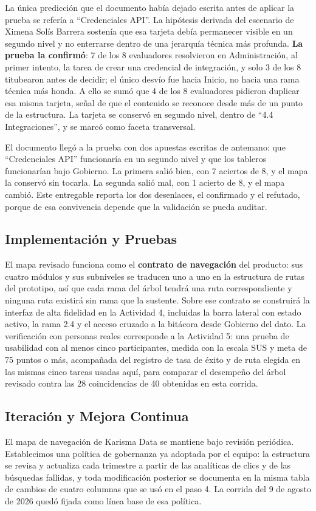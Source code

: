La única predicción que el documento había dejado escrita antes de aplicar la prueba se refería a ``Credenciales API''. La hipótesis derivada del escenario de Ximena Solís Barrera sostenía que esa tarjeta debía permanecer visible en un segundo nivel y no enterrarse dentro de una jerarquía técnica más profunda. \textbf{La prueba la confirmó}: 7 de los 8 evaluadores resolvieron en Administración, al primer intento, la tarea de crear una credencial de integración, y solo 3 de los 8 titubearon antes de decidir; el único desvío fue hacia Inicio, no hacia una rama técnica más honda. A ello se sumó que 4 de los 8 evaluadores pidieron duplicar esa misma tarjeta, señal de que el contenido se reconoce desde más de un punto de la estructura. La tarjeta se conservó en segundo nivel, dentro de ``4.4 Integraciones'', y se marcó como faceta transversal.

\begin{uxnota}
El documento llegó a la prueba con dos apuestas escritas de antemano: que ``Credenciales API'' funcionaría en un segundo nivel y que los tableros funcionarían bajo Gobierno. La primera salió bien, con 7 aciertos de 8, y el mapa la conservó sin tocarla. La segunda salió mal, con 1 acierto de 8, y el mapa cambió. Este entregable reporta los dos desenlaces, el confirmado y el refutado, porque de esa convivencia depende que la validación se pueda auditar.
\end{uxnota}

\subsection{Implementación y Pruebas}
El mapa revisado funciona como el \textbf{contrato de navegación} del producto: sus cuatro módulos y sus subniveles se traducen uno a uno en la estructura de rutas del prototipo, así que cada rama del árbol tendrá una ruta correspondiente y ninguna ruta existirá sin rama que la sustente. Sobre ese contrato se construirá la interfaz de alta fidelidad en la Actividad 4, incluidas la barra lateral con estado activo, la rama 2.4 y el acceso cruzado a la bitácora desde Gobierno del dato. La verificación con personas reales corresponde a la Actividad 5: una prueba de usabilidad con al menos cinco participantes, medida con la escala SUS y meta de 75 puntos o más, acompañada del registro de tasa de éxito y de ruta elegida en las mismas cinco tareas usadas aquí, para comparar el desempeño del árbol revisado contra las 28 coincidencias de 40 obtenidas en esta corrida.

\subsection{Iteración y Mejora Continua}
El mapa de navegación de Karisma Data se mantiene bajo revisión periódica. Establecimos una política de gobernanza ya adoptada por el equipo: la estructura se revisa y actualiza cada trimestre a partir de las analíticas de clics y de las búsquedas fallidas, y toda modificación posterior se documenta en la misma tabla de cambios de cuatro columnas que se usó en el paso 4. La corrida del 9 de agosto de 2026 quedó fijada como línea base de esa política.

